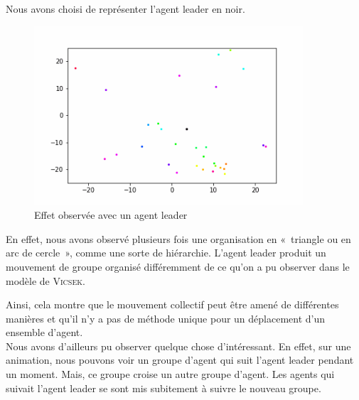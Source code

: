 \documentclass[french, a4paper, 12pt, openany]{report}
\begin{document}
   Nous avons choisi de représenter l'agent leader en noir.
   \begin{figure}[!h]
		\centering
		\includegraphics[width=10cm]{images/image_15.png}
		\caption{Effet observée avec un agent leader}
		\label{leader}
	\end{figure}  
	
	   En effet, nous avons observé plusieurs fois une organisation en «~triangle ou en arc de cercle~», comme une sorte de hiérarchie. L'agent leader produit un mouvement de groupe organisé différemment de ce qu'on a pu observer dans le modèle de \textsc{Vicsek}.
	   
	   Ainsi, cela montre que le mouvement collectif peut être amené de différentes manières et qu'il n'y a pas de méthode unique pour un déplacement d'un ensemble d'agent.\\
    
  
       Nous avons d'ailleurs pu observer quelque chose d'intéressant. En effet, sur une animation, nous pouvons voir un groupe d'agent qui suit l'agent leader pendant un moment. Mais, ce groupe croise un autre groupe d'agent. Les agents qui suivait l'agent leader se sont mis subitement à suivre le nouveau groupe. 
       
\end{document}
